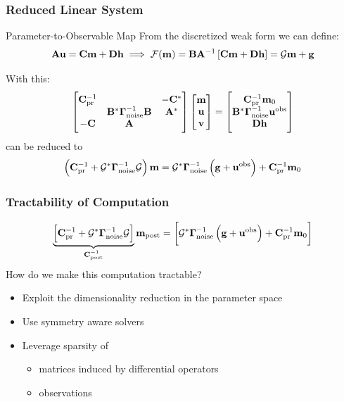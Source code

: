 \documentclass[
    pdf,
    10pt,
    xcolor={svgnames},
  ]{beamer}
\newcommand{\mc}[1]{\mathcal{#1}}
\newcommand{\mat}[1]{\mathbf{{#1}}}
\newcommand{\obs}{\mathbf{u}^{\rm obs}}
\begin{document}
\begin{frame}
  \frametitle{Reduced Linear System}
  \begin{block}{Parameter-to-Observable Map}
    From the discretized weak form we can define:
    \[
      \mat{A}\vb{u} = \mat{C} \vb{m} + \mat{D} \vb{h}
      \implies
      \mc{F}(\vb{m}) = \mat{B} \mat{A}^{-1} \left[
        \mat{C} \vb{m} + \mat{D} \vb{h}
      \right]
      = \mc{G} \vb{m} + \vb{g}
    \]
  \end{block}
  \pause
  With this:
  \[
    \begin{bmatrix}
      \mat{C}_{\rm pr}^{-1} & & -\mat{C}^* \\
       & \mat{B}^* \vb{\Gamma}_{\rm noise}^{-1} \mat{B} & \mat{A}^* \\
      -\mat{C} & \mat{A} & 
    \end{bmatrix}
    \begin{bmatrix} \vb{m} \\ \vb{u} \\ \vb{v} \end{bmatrix}
    = \begin{bmatrix}
      \mat{C}_{\rm pr}^{-1} \vb{m}_0 \\ 
      \mat{B}^* \vb{\Gamma}_{\rm noise}^{-1} \obs \\
      \mat{D} \vb{h}
    \end{bmatrix}
  \]
  can be reduced to
  \[
    \left(
      \mat{C}_{\rm pr}^{-1} + \mc{G}^* \vb{\Gamma}_{\rm noise}^{-1} \mc{G}
    \right)\vb{m}
    = \mc{G}^* \vb{\Gamma}_{\rm noise}^{-1} \left( \vb{g} + \obs \right)
    + \mat{C}_{\rm pr}^{-1} \vb{m}_0
  \]
\end{frame}

\begin{frame}
  \frametitle{Tractability of Computation}
  \[
    \underbrace{\left[
        \mat{C}_{\rm pr}^{-1} + \mc{G}^* \vb{\Gamma}_{\rm noise}^{-1} \mc{G}
    \right]}_{\mat{C}_{\rm post}^{-1}}
    \vb{m}_{\rm post}
    =
    \left[
      \mc{G}^* \vb{\Gamma}_{\rm noise}^{-1} \left( \vb{g} + \obs \right)
      + \mat{C}_{\rm pr}^{-1} \vb{m}_0
    \right]
  \]
  How do we make this computation tractable?
  \pause
  \begin{itemize}
    \item Exploit the dimensionality reduction in the parameter space
    \item Use symmetry aware solvers
    \item Leverage sparsity of 
      \begin{itemize}
        \item matrices induced by differential operators
        \item observations
      \end{itemize}
  \end{itemize}
\end{frame}
\end{document}
